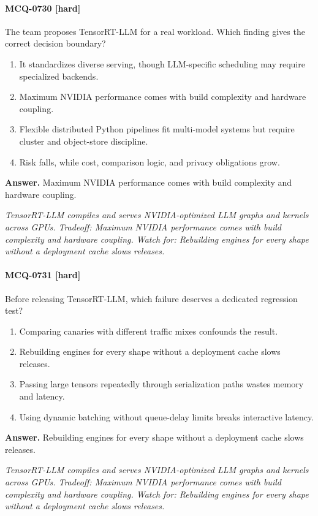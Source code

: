 \paragraph{MCQ-0730 [hard]} The team proposes TensorRT-LLM for a real workload. Which finding gives the correct decision boundary?
\begin{enumerate}[label=\Alph*.]
\item It standardizes diverse serving, though LLM-specific scheduling may require specialized backends.
\item Maximum NVIDIA performance comes with build complexity and hardware coupling.
\item Flexible distributed Python pipelines fit multi-model systems but require cluster and object-store discipline.
\item Risk falls, while cost, comparison logic, and privacy obligations grow.
\end{enumerate}
\noindent\textbf{Answer.} Maximum NVIDIA performance comes with build complexity and hardware coupling.
\par\textit{TensorRT-LLM compiles and serves NVIDIA-optimized LLM graphs and kernels across GPUs. Tradeoff: Maximum NVIDIA performance comes with build complexity and hardware coupling. Watch for: Rebuilding engines for every shape without a deployment cache slows releases.}
\paragraph{MCQ-0731 [hard]} Before releasing TensorRT-LLM, which failure deserves a dedicated regression test?
\begin{enumerate}[label=\Alph*.]
\item Comparing canaries with different traffic mixes confounds the result.
\item Rebuilding engines for every shape without a deployment cache slows releases.
\item Passing large tensors repeatedly through serialization paths wastes memory and latency.
\item Using dynamic batching without queue-delay limits breaks interactive latency.
\end{enumerate}
\noindent\textbf{Answer.} Rebuilding engines for every shape without a deployment cache slows releases.
\par\textit{TensorRT-LLM compiles and serves NVIDIA-optimized LLM graphs and kernels across GPUs. Tradeoff: Maximum NVIDIA performance comes with build complexity and hardware coupling. Watch for: Rebuilding engines for every shape without a deployment cache slows releases.}
